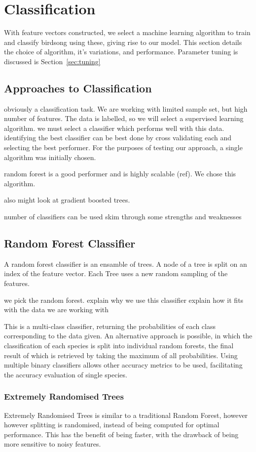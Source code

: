 \section{Classification}
With feature vectors constructed, we select a machine learning algorithm to
train and classify birdsong using these, giving rise to our model.
This section details the choice of algorithm, it's variations, and performance.
Parameter tuning is discussed is Section~\ref{sec:tuning}

\subsection{Approaches to Classification}
obviously a classification task.
We are working with limited sample set, but high number of features.
The data is labelled, so we will select a supervised learning algorithm.
we must select a classifier which performs well with this data.
identifying the best classifier can be best done by cross validating each and
selecting the best performer.
For the purposes of testing our approach, a single algorithm was initially
chosen.

random forest is a good performer and is highly scalable (ref).
We chose this algorithm.

also might look at gradient boosted trees.

number of classifiers can be used
skim through some strengths and weaknesses

\subsection{Random Forest Classifier}
A random forest classifier is an ensamble of trees.
A node of a tree is split on an index of the feature vector.
Each Tree uses a new random sampling of the features.

we pick the random forest.
explain why we use this classifier
explain how it fits with the data we are working with

This is a multi-class classifier, returning the probabilities of each class
corresponding to the data given.
An alternative approach is possible, in which the classification of each species
is split into individual random forests, the final result of which is retrieved
by taking the maximum of all probabilities.
Using multiple binary classifiers allows other accuracy metrics to be used,
facilitating the accuracy evaluation of single species.

\subsubsection{Extremely Randomised Trees}
Extremely Randomised Trees is similar to a traditional Random Forest, however
however splitting is randomised, instead of being computed for optimal
performance.
This has the benefit of being faster, with the drawback of being more sensitive
to noisy features.\\

